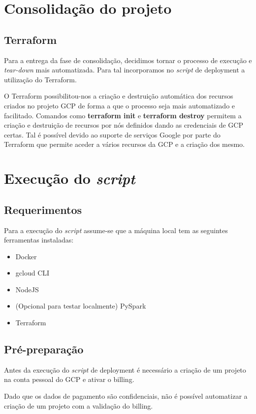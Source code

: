\documentclass[11pt,a4paper]{article}
\begin{document}
\section{Consolidação do projeto}
\subsection{Terraform}
Para a entrega da fase de consolidação, decidimos tornar o processo de execução e \textit{tear-down} mais automatizada. Para tal incorporamos no \textit{script} de deployment a utilização do Terraform.

O Terraform possibilitou-nos a criação e destruição automática dos recursos criados no projeto GCP de forma a que o processo seja mais automatizado e facilitado. Comandos como \textbf{terraform init} e \textbf{terraform destroy} permitem a criação e destruição de recursos por nós definidos dando as credenciais de GCP certas. Tal é possível devido ao suporte de serviços Google por parte do Terraform que permite aceder a vários recursos da GCP e a criação dos mesmo.

\section{Execução do \textit{script}}
\subsection{Requerimentos}
Para a execução do \textit{script} assume-se que a máquina local tem as seguintes ferramentas instaladas:
\begin{itemize}
	\item Docker
	\item gcloud CLI
	\item NodeJS
	\item (Opcional para testar localmente) PySpark
	\item Terraform
\end{itemize}

\subsection{Pré-preparação}
Antes da execução do \textit{script} de deployment é necessário a criação de um projeto na conta pessoal do GCP e ativar o billing.

Dado que os dados de pagamento são confidenciais, não é possível automatizar a criação de um projeto com a validação do billing.
\end{document}
